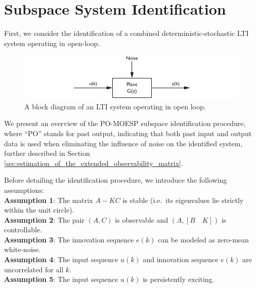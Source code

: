 \section{Subspace System Identification}
First, we consider the identification of a combined deterministic-stochastic LTI system operating in open-loop.
\begin{figure}[b!]
	\centering
	\includegraphics{../fig/open_loop_block_diagram.pdf}
	\caption{A block diagram of an LTI system operating in open loop.}
\end{figure}
We present an overview of the PO-MOESP subspace identification procedure, where ``PO'' stands for past output, indicating that both past input and output data is used when eliminating the influence of noise on the identified system, further described in Section \ref{sec:estimation_of_the_extended_observability_matrix}. 

\newpage 
Before detailing the identification procedure, we introduce the following assumptions:\\
\textbf{Assumption 1}: The matrix $A - KC$ is stable (i.e.\ its eigenvalues lie strictly within the unit circle).\\
\textbf{Assumption 2}: The pair $(A,C)$ is observable and $(A, [B \quad K])$ is controllable.\\
\textbf{Assumption 3}: The innovation sequence $e(k)$ can be modeled as zero-mean white-noise.\\
\textbf{Assumption 4}: The input sequence $u(k)$ and innovation sequence $e(k)$ are uncorrelated for all $k$.\\
\textbf{Assumption 5}: The input sequence $u(k)$ is persistently exciting.

